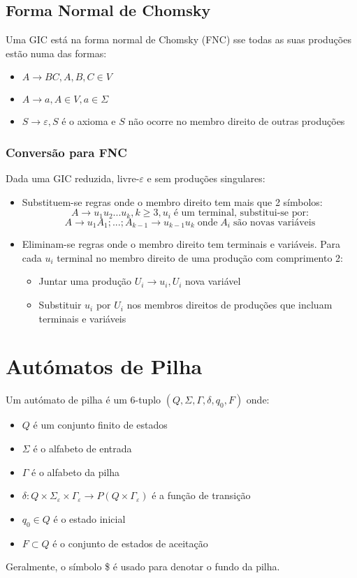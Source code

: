 \documentclass[10pt,a4paper]{report}
\begin{document}
\subsection{Forma Normal de Chomsky}
Uma GIC está na forma normal de Chomsky (FNC) sse todas as suas produções estão numa das formas:
\begin{itemize}
\item $A \rightarrow BC, A,B,C \in V$
\item $A \rightarrow a, A \in V, a \in \Sigma$
\item $S \rightarrow \varepsilon, S$ é o axioma e $S$ não ocorre no membro direito de outras produções
\end{itemize}
\subsubsection{Conversão para FNC}
Dada uma GIC reduzida, livre-$\varepsilon$ e sem produções singulares:
\begin{itemize}
\item Substituem-se regras onde o membro direito tem mais que 2 símbolos:
$$
A \rightarrow u_1u_2...u_k, k \geq 3, u_i \; \text{é um terminal, substitui-se por:}
$$
$$
A \rightarrow u_1A_1; ...; A_{k-1} \rightarrow u_{k-1}u_k \; \text{onde} \; A_i \; \text{são novas variáveis}
$$
\item Eliminam-se regras onde o membro direito tem terminais e variáveis. Para cada $u_i$ terminal no membro direito de uma produção com comprimento 2:
\begin{itemize}
\item Juntar uma produção $U_i \rightarrow u_i, U_i$ nova variável
\item Substituir $u_i$ por $U_i$ nos membros direitos de produções que incluam terminais e variáveis
\end{itemize}
\end{itemize}

\section{Autómatos de Pilha}
Um autómato de pilha é um 6-tuplo $(Q, \Sigma, \Gamma, \delta, q_0, F)$ onde:
\begin{itemize}
\item $Q$ é um conjunto finito de estados
\item $\Sigma$ é o alfabeto de entrada
\item $\Gamma$ é o alfabeto da pilha
\item $\delta : Q \times \Sigma_\varepsilon \times \Gamma_\varepsilon \rightarrow P(Q\times\Gamma_\varepsilon)$ é a função de transição
\item $q_0 \in Q$ é o estado inicial
\item $F \subset Q$ é o conjunto de estados de aceitação 
\end{itemize}
Geralmente, o símbolo \$ é usado para denotar o fundo da pilha.
\end{document}
